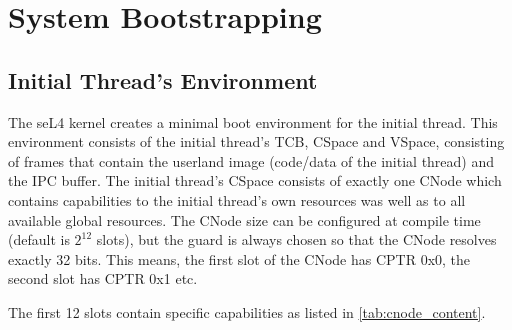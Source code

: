 %
%
%
%

\chapter{\label{ch:bootup}System Bootstrapping}

\section{Initial Thread's Environment}

The seL4 kernel creates a minimal boot environment for the initial thread.
This environment consists of the initial thread's TCB, CSpace and VSpace,
consisting of frames that contain the userland image (code/data of the initial
thread) and the IPC buffer.
The initial thread's CSpace consists of exactly one CNode
which contains capabilities to the initial
thread's own resources was well as to all available global resources.
The CNode size can be configured at compile time (default is $2^{12}$
slots), but the guard is always chosen so that the CNode resolves exactly
32 bits. This means, the first slot of the CNode has CPTR 0x0, the
second slot has CPTR 0x1 etc.

The first 12 slots contain specific capabilities as listed in
\autoref{tab:cnode_content}.

